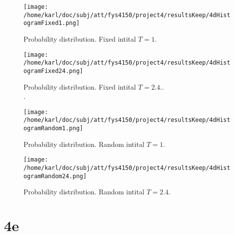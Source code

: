 \documentclass{article}
\begin{document}
\begin{minipage}{.45\textwidth} 
	\begin{figure}[H]
		\centering
		\texttt{[image: /home/karl/doc/subj/att/fys4150/project4/resultsKeep/4dHistogramFixed1.png]}
		\caption{Probability distribution. Fixed intital $T = 1$. \\ \textit{}}
		\label{1}
	\end{figure}
\end{minipage}\hfill
\begin{minipage}{.45\textwidth} 
	\begin{figure}[H]
		\centering
		\texttt{[image: /home/karl/doc/subj/att/fys4150/project4/resultsKeep/4dHistogramFixed24.png]}
		\caption{Probability distribution. Fixed intital $T = 2.4$.. \\ \textit{}.}
		\label{1}
	\end{figure}
\end{minipage}\hfill
\vspace{2ex}

\begin{minipage}{.45\textwidth} 
	\begin{figure}[H]
		\centering
		\texttt{[image: /home/karl/doc/subj/att/fys4150/project4/resultsKeep/4dHistogramRandom1.png]}
		\caption{Probability distribution. Random intital $T = 1$. \\ \textit{}}
		\label{1}
	\end{figure}
\end{minipage}\hfill
\begin{minipage}{.45\textwidth} 
	\begin{figure}[H]
		\centering
		\texttt{[image: /home/karl/doc/subj/att/fys4150/project4/resultsKeep/4dHistogramRandom24.png]}
		\caption{Probability distribution. Random intital $T = 2.4$.  \\ \textit{}}
		\label{1}
	\end{figure}
\end{minipage}\hfill
\vspace{2ex}



\section{4e}
\end{document}
